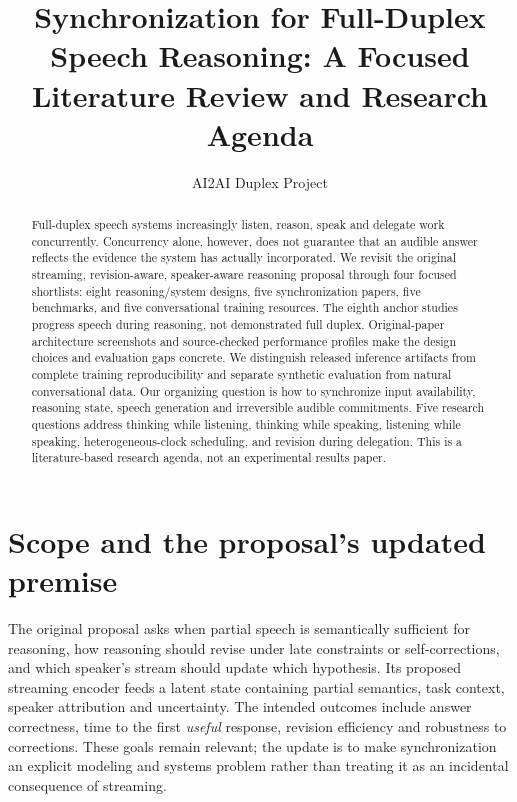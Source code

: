 \documentclass{article}
\title{Synchronization for Full-Duplex Speech Reasoning: A Focused Literature Review and Research Agenda}
\author{AI2AI Duplex Project}
\begin{document}
\maketitle
\rhead{}
\cfoot{\thepage}
\raggedbottom
\setlength{\intextsep}{5pt plus 1pt minus 1pt}

\begin{abstract}
Full-duplex speech systems increasingly listen, reason, speak and delegate work concurrently. Concurrency alone, however, does not guarantee that an audible answer reflects the evidence the system has actually incorporated. We revisit the original streaming, revision-aware, speaker-aware reasoning proposal through four focused shortlists: eight reasoning/system designs, five synchronization papers, five benchmarks, and five conversational training resources. The eighth anchor studies progress speech during reasoning, not demonstrated full duplex. Original-paper architecture screenshots and source-checked performance profiles make the design choices and evaluation gaps concrete. We distinguish released inference artifacts from complete training reproducibility and separate synthetic evaluation from natural conversational data. Our organizing question is how to synchronize input availability, reasoning state, speech generation and irreversible audible commitments. Five research questions address thinking while listening, thinking while speaking, listening while speaking, heterogeneous-clock scheduling, and revision during delegation. This is a literature-based research agenda, not an experimental results paper.
\end{abstract}

\section{Scope and the proposal's updated premise}
\label{sec:scope}
The original proposal asks when partial speech is semantically sufficient for reasoning, how reasoning should revise under late constraints or self-corrections, and which speaker's stream should update which hypothesis. Its proposed streaming encoder feeds a latent state containing partial semantics, task context, speaker attribution and uncertainty. The intended outcomes include answer correctness, time to the first \emph{useful} response, revision efficiency and robustness to corrections. These goals remain relevant; the update is to make synchronization an explicit modeling and systems problem rather than treating it as an incidental consequence of streaming.
\end{document}
